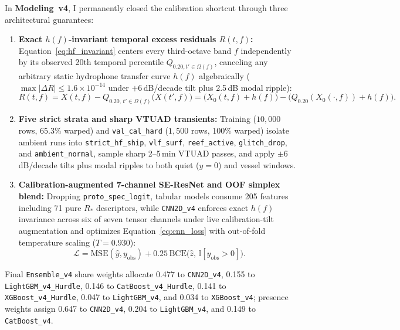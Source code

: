 \documentclass[10pt,a4paper]{article}
\begin{document}
In \textbf{Modeling~v4}, I permanently closed the calibration shortcut through three architectural guarantees:
\begin{enumerate}
    \item \textbf{Exact $h(f)$-invariant temporal excess residuals $R(t,f)$:} Equation~\eqref{eq:hf_invariant} centers every third-octave band $f$ independently by its observed 20th temporal percentile $Q_{0.20, t' \in \Omega(f)}$, canceling any arbitrary static hydrophone transfer curve $h(f)$ algebraically ($\max|\Delta R| \le 1.6 \times 10^{-14}$ under $+6$\,dB/decade tilt plus 2.5\,dB modal ripple):
    \begin{equation}
    \label{eq:hf_invariant}
    R(t, f) = X(t, f) - Q_{0.20,\, t' \in \Omega(f)}\!\big(X(t', f)\big)
            = \big(X_0(t,f) + h(f)\big) - \big(Q_{0.20}(X_0(\cdot,f)) + h(f)\big).
    \end{equation}
    \item \textbf{Five strict strata and sharp VTUAD transients:} Training ($10{,}000$ rows, 65.3\% warped) and \texttt{val\_cal\_hard} ($1{,}500$ rows, 100\% warped) isolate ambient runs into \texttt{strict\_hf\_ship}, \texttt{vlf\_surf}, \texttt{reef\_active}, \texttt{glitch\_drop}, and \texttt{ambient\_normal}, sample sharp 2--5\,min VTUAD passes, and apply $\pm 6$\,dB/decade tilts plus modal ripples to both quiet ($y=0$) and vessel windows.
    \item \textbf{Calibration-augmented 7-channel SE-ResNet and OOF simplex blend:} Dropping \texttt{proto\_spec\_logit}, tabular models consume 205 features including 71 pure $R_*$ descriptors, while \texttt{CNN2D\_v4} enforces exact $h(f)$ invariance across six of seven tensor channels under live calibration-tilt augmentation and optimizes Equation~\eqref{eq:cnn_loss} with out-of-fold temperature scaling ($T=0.930$):
    \begin{equation}
    \label{eq:cnn_loss}
    \mathcal{L} = \mathrm{MSE}(\hat{y}, y_{\mathrm{obs}}) + 0.25\,\mathrm{BCE}\big(\hat{z},\, \mathbb{I}[y_{\mathrm{obs}} > 0]\big).
    \end{equation}
\end{enumerate}
Final \texttt{Ensemble\_v4} share weights allocate 0.477 to \texttt{CNN2D\_v4}, 0.155 to \texttt{LightGBM\_v4\_Hurdle}, 0.146 to \texttt{CatBoost\_v4\_Hurdle}, 0.141 to \texttt{XGBoost\_v4\_Hurdle}, 0.047 to \texttt{LightGBM\_v4}, and 0.034 to \texttt{XGBoost\_v4}; presence weights assign 0.647 to \texttt{CNN2D\_v4}, 0.204 to \texttt{LightGBM\_v4}, and 0.149 to \texttt{CatBoost\_v4}.
\end{document}
